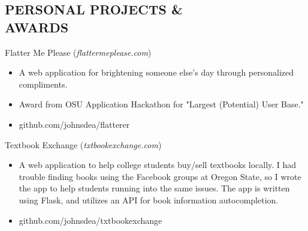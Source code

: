 \documentclass[margin]{res}
\begin{document}
\begin{resume}
\section{PERSONAL PROJECTS \&\\ AWARDS}
            Flatter Me Please ({\sl flattermeplease.com})
            \begin{itemize} \itemsep -2pt
                \item A web application for brightening someone else's day through
                    personalized compliments.
                \item Award from OSU Application Hackathon for "Largest (Potential) User Base."
                \item github.com/johnsdea/flatterer
            \end{itemize}
            Textbook Exchange ({\sl txtbookexchange.com})
            \begin{itemize} \itemsep -2pt
                \item A web application to help college students buy/sell textbooks locally.
                    I had trouble finding books using the Facebook groups at Oregon State, 
                    so I wrote the app to help students running into the same issues. The app is
                    written using Flask, and utilizes an API for book information autocompletion.
                \item github.com/johnsdea/txtbookexchange
            \end{itemize}

\end{resume}
\end{document}
